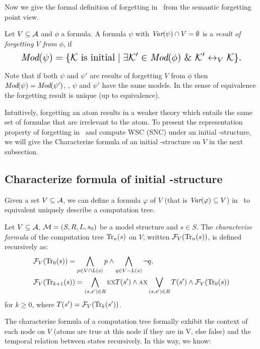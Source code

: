 \documentclass{article}
\begin{document}
Now we give the formal definition of forgetting in \CTL\ from the semantic forgetting point view.
\begin{definition}[Forgetting]\label{def:V:forgetting}
  Let $V\subseteq\cal A$ and $\phi$ a formula.
A formula $\psi$ with $\textit{Var}(\psi)\cap V=\emptyset$
is a {\em result of forgetting $V$ from} $\phi$, if
\begin{equation}
\resizebox{.91\linewidth}{!}{$
\displaystyle
  \Mod(\psi)=\{{\cal K}\mbox{ is initial}\mid \exists {\cal K}'\in\Mod(\phi)\ \&\ {\cal K}'\lrto_V{\cal K}\}.
  $}
\end{equation}
\end{definition}
Note that if both $\psi$ and $\psi'$ are results of forgetting $V$ from $\phi$ then
$\textit{Mod}(\psi)=\textit{Mod}(\psi')$, \ie, $\psi$ and $\psi'$ have the same models. In the sense
of equivalence the forgetting result is unique (up to equivalence).

Intuitively, forgetting an atom results in a weaker theory which entails the same set of formulae that are irrelevant to the atom.
To present the representation property of forgetting in \CTL\ and compute WSC (SNC) under an initial \MPK-structure, we will give the Characterize formula of an initial \MPK-structure on $V$ in the next subsection.

\subsection{Characterize formula of initial \MPK-structure}
Given a set $V\subseteq{\cal A}$, we can define a formula $\varphi$ of $V$ (that is $\textit{Var}(\varphi) \subseteq V$) in \CTL\ to equivalent uniquely describe a computation tree.
\begin{definition}\label{def:V:char:formula}
Let $V\subseteq {\cal A}$, ${\cal M} =(S,R,L,s_0)$ be a model structure and $s\in S$.
The {\em characterize formula} of the computation tree $\textrm{Tr}_n(s)$ on $V$,
written ${\cal F}_V(\textrm{Tr}_n(s))$, is defined recursively as:
\begin{align*}
  & {\cal F}_V(\textrm{Tr}_0(s)) = \bigwedge_{p \in V\cap L(s)}p
     \wedge \bigwedge_{q\in V-L(s)} \neg q,\\
  & {\cal F}_V(\textrm{Tr}_{k+1}(s)) = \bigwedge_{(s,s')\in R}
    \textsc{e} \textsc{x} T(s')
    \wedge
    \textsc{a} \textsc{x} \bigvee_{(s,s')\in R} T(s')
    \wedge {\cal F}_V(\textrm{Tr}_0(s))
\end{align*}
for $k\ge 0$, where $T(s') = {\cal F}_V(\textrm{Tr}_k(s'))$.
\end{definition}
The characterize formula of a computation tree formally exhibit the context of each node on $V$ (atoms are true at this node if they are in V, else false) and the temporal relation between states recursively. In this way, we know:
\end{document}
